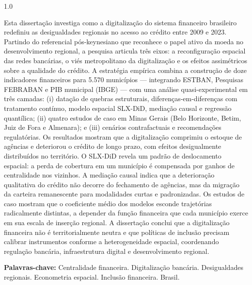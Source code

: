 \begin{spacing}{1.0}
\justify

\setlength{\parindent}{0pt}

Esta dissertação investiga como a digitalização do sistema financeiro brasileiro redefiniu as desigualdades regionais no acesso ao crédito entre 2009 e 2023. Partindo do referencial pós-keynesiano que reconhece o papel ativo da moeda no desenvolvimento regional, a pesquisa articula três eixos: a reconfiguração espacial das redes bancárias, o viés metropolitano da digitalização e os efeitos assimétricos sobre a qualidade do crédito. A estratégia empírica combina a construção de doze indicadores financeiros para 5.570 municípios --- integrando ESTBAN, Pesquisas FEBRABAN e PIB municipal (IBGE) --- com uma análise quasi-experimental em três camadas: (i) datação de quebras estruturais, diferenças-em-diferenças com tratamento contínuo, modelo espacial SLX-DiD, mediação causal e regressão quantílica; (ii) quatro estudos de caso em Minas Gerais (Belo Horizonte, Betim, Juiz de Fora e Almenara); e (iii) cenários contrafactuais e recomendações regulatórias. Os resultados mostram que a digitalização comprimiu o estoque de agências e deteriorou o crédito de longo prazo, com efeitos desigualmente distribuídos no território. O SLX-DiD revela um padrão de deslocamento espacial: a perda de cobertura em um município é compensada por ganhos de centralidade nos vizinhos. A mediação causal indica que a deterioração qualitativa do crédito não decorre do fechamento de agências, mas da migração da carteira remanescente para modalidades curtas e padronizadas. Os estudos de caso mostram que o coeficiente médio dos modelos esconde trajetórias radicalmente distintas, a depender da função financeira que cada município exerce em sua escala de inserção regional. A dissertação conclui que a digitalização financeira não é territorialmente neutra e que políticas de inclusão precisam calibrar instrumentos conforme a heterogeneidade espacial, coordenando regulação bancária, infraestrutura digital e desenvolvimento regional.

\vspace{1em}
\textbf{Palavras-chave:} Centralidade financeira. Digitalização bancária. Desigualdades regionais. Econometria espacial. Inclusão financeira. Brasil.

\setlength{\parindent}{15pt}

\end{spacing}

\newpage
\pagestyle{fancy}

